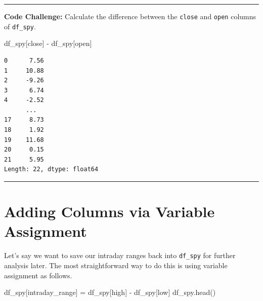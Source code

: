 \documentclass[
  letterpaper,
  DIV=11,
  numbers=noendperiod]{scrreprt}
\newenvironment{Shaded}{\begin{snugshade}}{\end{snugshade}}
\newcommand{\NormalTok}[1]{\textcolor[rgb]{0.00,0.23,0.31}{#1}}
\newcommand{\OperatorTok}[1]{\textcolor[rgb]{0.37,0.37,0.37}{#1}}
\newcommand{\StringTok}[1]{\textcolor[rgb]{0.13,0.47,0.30}{#1}}
\begin{document}
\begin{center}\rule{0.5\linewidth}{0.5pt}\end{center}

\textbf{Code Challenge:} Calculate the difference between the
\texttt{close} and \texttt{open} columns of \texttt{df\_spy}.

\begin{Shaded}
\begin{Highlighting}[]
\NormalTok{df\_spy[}\StringTok{\textquotesingle{}close\textquotesingle{}}\NormalTok{] }\OperatorTok{{-}}\NormalTok{ df\_spy[}\StringTok{\textquotesingle{}open\textquotesingle{}}\NormalTok{]}
\end{Highlighting}
\end{Shaded}

\begin{verbatim}
0      7.56
1     10.88
2     -9.26
3      6.74
4     -2.52
      ...  
17     8.73
18     1.92
19    11.68
20     0.15
21     5.95
Length: 22, dtype: float64
\end{verbatim}

\begin{center}\rule{0.5\linewidth}{0.5pt}\end{center}

\hypertarget{adding-columns-via-variable-assignment}{%
\section{Adding Columns via Variable
Assignment}\label{adding-columns-via-variable-assignment}}

Let's say we want to save our intraday ranges back into \texttt{df\_spy}
for further analysis later. The most straightforward way to do this is
using variable assignment as follows.

\begin{Shaded}
\begin{Highlighting}[]
\NormalTok{df\_spy[}\StringTok{\textquotesingle{}intraday\_range\textquotesingle{}}\NormalTok{] }\OperatorTok{=}\NormalTok{ df\_spy[}\StringTok{\textquotesingle{}high\textquotesingle{}}\NormalTok{] }\OperatorTok{{-}}\NormalTok{ df\_spy[}\StringTok{\textquotesingle{}low\textquotesingle{}}\NormalTok{]}
\NormalTok{df\_spy.head()}
\end{Highlighting}
\end{Shaded}
\end{document}
